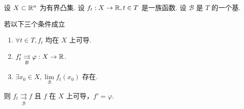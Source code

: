 \begin{theorem}
    设 $X\subset\mathbb{R}^n$ 为有界凸集. 设 $f_t:X\to\mathbb{R},t\in T$ 是一族函数. 设 $\mathcal{B}$ 是 $T$ 的一个基.

    若以下三个条件成立

    \begin{enumerate}
        \item $\forall t\in T,f_t$ 均在 $X$ 上可导.
        
        \item $f_t'\underset{\mathcal{B}}{\rightrightarrows}\varphi:X\to\mathbb{R}$.
        
        \item $\exists x_0\in X,\lim\limits_{\mathcal{B}}f_t(x_0)$ 存在.
    \end{enumerate}

    则 $f_t\underset{\mathcal{B}}{\rightrightarrows}{f}$ 且 $f$ 在 $X$ 上可导，$f'=\varphi$.
\end{theorem}
